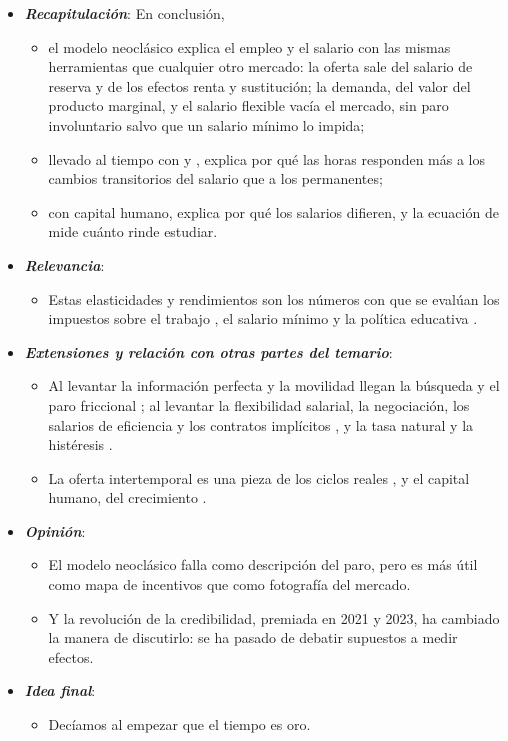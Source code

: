 \documentclass[11pt]{article}
\begin{document}
\begin{itemize}
\item \textbf{\emph{Recapitulación}}: En conclusión,
  \begin{itemize}
  \item el modelo neoclásico explica el empleo y el salario con las mismas herramientas que cualquier otro mercado: la oferta sale del salario de reserva y de los efectos renta y sustitución; la demanda, del valor del producto marginal, y el salario flexible vacía el mercado, sin paro involuntario salvo que un salario mínimo lo impida;
  \item llevado al tiempo con  y , explica por qué las horas responden más a los cambios transitorios del salario que a los permanentes;
  \item con capital humano, explica por qué los salarios difieren, y la ecuación de  mide cuánto rinde estudiar.
  \end{itemize}
\item \textbf{\emph{Relevancia}}:
  \begin{itemize}
  \item Estas elasticidades y rendimientos son los números con que se evalúan los impuestos sobre el trabajo , el salario mínimo y la política educativa  .
  \end{itemize}
\item \textbf{\emph{Extensiones y relación con otras partes del temario}}:
  \begin{itemize}
  \item Al levantar la información perfecta y la movilidad llegan la búsqueda y el paro friccional ; al levantar la flexibilidad salarial, la negociación, los salarios de eficiencia y los contratos implícitos , y la tasa natural y la histéresis .

  \item La oferta intertemporal es una pieza de los ciclos reales , y el capital humano, del crecimiento  .
  \end{itemize}
\item \textbf{\emph{Opinión}}:
  \begin{itemize}
  \item El modelo neoclásico falla como descripción del paro, pero es más útil como mapa de incentivos que como fotografía del mercado.

  \item Y la revolución de la credibilidad, premiada en 2021 y 2023\nocite{Nobel2021,Nobel2023Goldin}, ha cambiado la manera de discutirlo: se ha pasado de debatir supuestos a medir efectos.
  \end{itemize}
\item \textbf{\emph{Idea final}}:
  \begin{itemize}
  \item Decíamos al empezar que el tiempo es oro.


\end{itemize}
\end{itemize}
\end{document}
